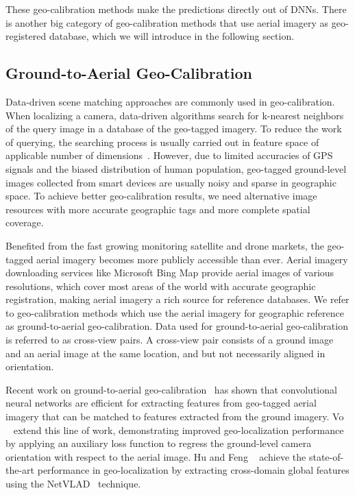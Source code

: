These geo-calibration methods make the predictions directly out of
DNNs.  There is another big category of geo-calibration methods that
use aerial imagery as geo-registered database, which we will introduce
in the following section.

\subsection{Ground-to-Aerial Geo-Calibration}
Data-driven scene matching approaches are commonly used in
geo-calibration.
When localizing a camera, data-driven algorithms search for k-nearest
neighbors of the query image in a database of the geo-tagged imagery.
To reduce the work of querying, the searching process is usually
carried out in feature space of applicable number of  
dimensions~\cite{im2gps, li2010location,zamir2010accurate}.
However, due to limited accuracies of GPS signals and the biased
distribution of human population, geo-tagged ground-level images
collected from smart devices are usually noisy and sparse in
geographic space. To achieve better geo-calibration results, we
need alternative image resources with more accurate geographic tags
and more complete spatial coverage.

Benefited from the fast growing monitoring satellite and drone markets,
the geo-tagged aerial imagery becomes more publicly accessible
than ever. Aerial imagery downloading services like
Microsoft Bing Map provide aerial images of various
resolutions, which cover most areas of the world with accurate
geographic registration, making aerial imagery a rich source for
reference databases. We refer to geo-calibration
methods which use the aerial imagery for geographic reference as
ground-to-aerial geo-calibration. Data used for ground-to-aerial
geo-calibration is referred to as cross-view pairs.
A cross-view pair consists of a ground image and an aerial image at
the same location, and but not necessarily aligned in orientation.

Recent work on ground-to-aerial
geo-calibration~\cite{lin2013cross,lin2015learning,workman2015geocnn,workman2015wide}
has shown that convolutional neural networks are efficient for extracting
features from geo-tagged aerial imagery that can be matched to
features extracted from the ground imagery.  Vo
\etal~\cite{vo2016localizing} extend this line of work, demonstrating
improved geo-localization performance by applying an auxiliary loss
function to regress the ground-level camera orientation with respect
to the aerial image. Hu and Feng \etal~\cite{mh2018cvm} achieve the
state-of-the-art performance in geo-localization by extracting
cross-domain global features using the
NetVLAD~\cite{arandjelovic2016netvlad} technique.


